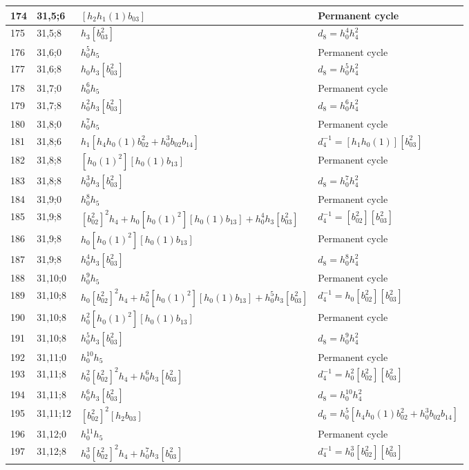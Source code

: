\documentclass{article}
\begin{document}
\begin{longtable}{|l|l|>{\raggedright\arraybackslash}p{6cm}|>{\raggedright\arraybackslash}p{6cm}|}
\hline
174 & 31,5;6 & $[h_2h_1(1)b_{03}]$ & Permanent cycle\\
\hline
175 & 31,5;8 & $h_3[b_{03}^2]$ &$d_{8}=h_0^4h_4^2$\\
\hline
176 & 31,6;0 & $h_0^5h_5$ & Permanent cycle\\
\hline
177 & 31,6;8 & $h_0h_3[b_{03}^2]$ &$d_{8}=h_0^5h_4^2$\\
\hline
178 & 31,7;0 & $h_0^6h_5$ & Permanent cycle\\
\hline
179 & 31,7;8 & $h_0^2h_3[b_{03}^2]$ &$d_{8}=h_0^6h_4^2$\\
\hline
180 & 31,8;0 & $h_0^7h_5$ & Permanent cycle\\
\hline
181 & 31,8;6 & $h_1[h_4h_0(1)b_{02}^2 + h_0^3b_{02}b_{14}]$ & $d_{4}^{-1}=[h_1h_0(1)][b_{03}^2]$\\
\hline
182 & 31,8;8 & $[h_0(1)^2][h_0(1)b_{13}]$ & Permanent cycle\\
183 & 31,8;8 & $h_0^3h_3[b_{03}^2]$ &$d_{8}=h_0^7h_4^2$\\
\hline
184 & 31,9;0 & $h_0^8h_5$ & Permanent cycle\\
\hline
185 & 31,9;8 & $[b_{02}^2]^2h_4 + h_0[h_0(1)^2][h_0(1)b_{13}] + h_0^4h_3[b_{03}^2]$ & $d_{4}^{-1}=[b_{02}^2][b_{03}^2]$\\
186 & 31,9;8 & $h_0[h_0(1)^2][h_0(1)b_{13}]$ & Permanent cycle\\
187 & 31,9;8 & $h_0^4h_3[b_{03}^2]$ &$d_{8}=h_0^8h_4^2$\\
\hline
188 & 31,10;0 & $h_0^9h_5$ & Permanent cycle\\
\hline
189 & 31,10;8 & $h_0[b_{02}^2]^2h_4 + h_0^2[h_0(1)^2][h_0(1)b_{13}] + h_0^5h_3[b_{03}^2]$ & $d_{4}^{-1}=h_0[b_{02}^2][b_{03}^2]$\\
190 & 31,10;8 & $h_0^2[h_0(1)^2][h_0(1)b_{13}]$ & Permanent cycle\\
191 & 31,10;8 & $h_0^5h_3[b_{03}^2]$ &$d_{8}=h_0^9h_4^2$\\
\hline
192 & 31,11;0 & $h_0^{10}h_5$ & Permanent cycle\\
\hline
193 & 31,11;8 & $h_0^2[b_{02}^2]^2h_4 + h_0^6h_3[b_{03}^2]$ & $d_{4}^{-1}=h_0^2[b_{02}^2][b_{03}^2]$\\
194 & 31,11;8 & $h_0^6h_3[b_{03}^2]$ &$d_{8}=h_0^{10}h_4^2$\\
\hline
195 & 31,11;12 & $[b_{02}^2]^2[h_2b_{03}]$ &$d_{6}=h_0^5[h_4h_0(1)b_{02}^2 + h_0^3b_{02}b_{14}]$\\
\hline
196 & 31,12;0 & $h_0^{11}h_5$ & Permanent cycle\\
\hline
197 & 31,12;8 & $h_0^3[b_{02}^2]^2h_4 + h_0^7h_3[b_{03}^2]$ & $d_{4}^{-1}=h_0^3[b_{02}^2][b_{03}^2]$\\

\end{longtable}
\end{document}
